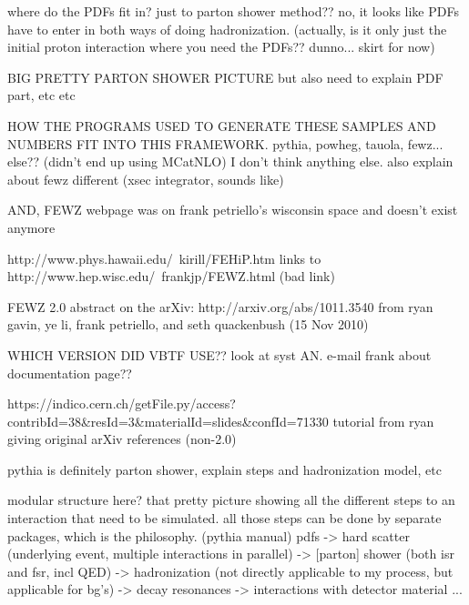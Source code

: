 where do the PDFs fit in?  just to parton shower method?? 
no, it looks like PDFs have to enter in both 
ways of doing hadronization. 
(actually, is it only just the initial 
proton interaction where you need the PDFs?? 
dunno... skirt for now)


BIG PRETTY PARTON SHOWER PICTURE but also need to explain PDF part, etc etc 




HOW THE PROGRAMS USED TO GENERATE THESE SAMPLES AND NUMBERS 
FIT INTO THIS FRAMEWORK.  
   pythia, powheg, tauola, fewz... else??  (didn't end up using MCatNLO) 
I don't think anything else.  
also explain about fewz different (xsec integrator, sounds like)

AND, FEWZ webpage was on frank petriello's wisconsin space and doesn't exist anymore

http://www.phys.hawaii.edu/~kirill/FEHiP.htm links to 
http://www.hep.wisc.edu/~frankjp/FEWZ.html (bad link)

FEWZ 2.0 abstract on the arXiv: http://arxiv.org/abs/1011.3540 
from ryan gavin, ye li, frank petriello, and seth quackenbush (15 Nov 2010)

WHICH VERSION DID VBTF USE??  look at syst AN.  
e-mail frank about documentation page??

https://indico.cern.ch/getFile.py/access?contribId=38\&resId=3\&materialId=slides\&confId=71330  tutorial from ryan giving original arXiv references (non-2.0)

pythia is definitely parton shower, 
explain steps and hadronization model, etc

modular structure here?  that pretty picture showing all the 
different steps to an interaction that need to be 
simulated. 
all those steps can be done by separate packages, 
which is the philosophy.  (pythia manual)
pdfs ->
hard scatter (underlying event, multiple interactions in parallel) ->
[parton] shower (both isr and fsr, incl QED) ->
hadronization (not directly applicable to my process, but applicable for bg's) -> 
decay resonances -> interactions with detector material ...

